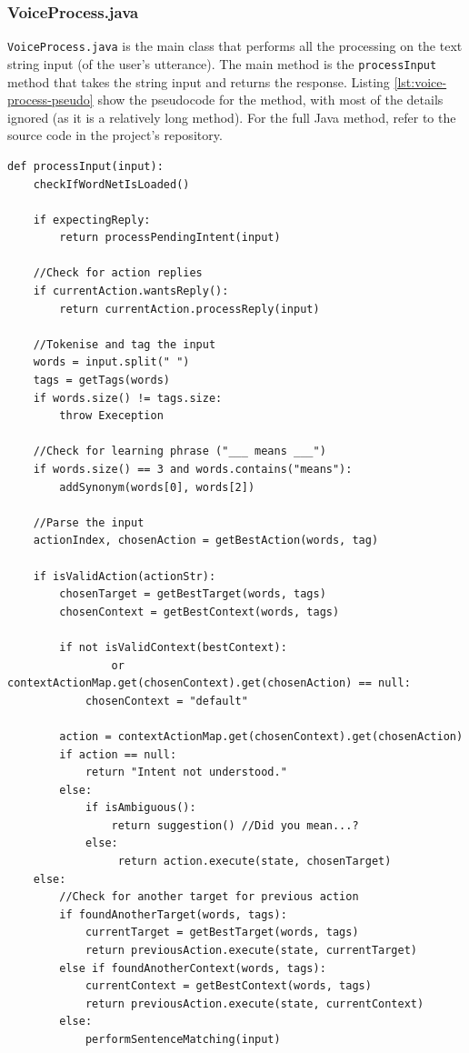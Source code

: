 \documentclass[12pt]{article}
\begin{document}
\subsubsection{VoiceProcess.java}

\texttt{VoiceProcess.java} is the main class that performs all the processing on the text string input (of the user's utterance). The main method is the \texttt{processInput} method that takes the string input and returns the response. Listing \ref{lst:voice-process-pseudo} show the pseudocode for the method, with most of the details ignored (as it is a relatively long method). For the full Java method, refer to the source code in the project's repository.

\begin{lstlisting}[caption=VoiceProcess.processInput() pseudocode, label={lst:voice-process-pseudo}]
def processInput(input):
    checkIfWordNetIsLoaded()
    
    if expectingReply:
        return processPendingIntent(input)
    
    //Check for action replies
    if currentAction.wantsReply():
        return currentAction.processReply(input)
    
    //Tokenise and tag the input
    words = input.split(" ")
    tags = getTags(words)
    if words.size() != tags.size:
        throw Exeception
    
    //Check for learning phrase ("___ means ___")
    if words.size() == 3 and words.contains("means"):
        addSynonym(words[0], words[2])
    
    //Parse the input
    actionIndex, chosenAction = getBestAction(words, tag)
    
    if isValidAction(actionStr):
        chosenTarget = getBestTarget(words, tags)
        chosenContext = getBestContext(words, tags)
        
        if not isValidContext(bestContext):
                or contextActionMap.get(chosenContext).get(chosenAction) == null:
            chosenContext = "default"
            
        action = contextActionMap.get(chosenContext).get(chosenAction)
        if action == null:
            return "Intent not understood."
        else:
            if isAmbiguous():
                return suggestion()	//Did you mean...?
            else:
                 return action.execute(state, chosenTarget)
    else:
    	//Check for another target for previous action
        if foundAnotherTarget(words, tags):
            currentTarget = getBestTarget(words, tags)
            return previousAction.execute(state, currentTarget)
        else if foundAnotherContext(words, tags):
            currentContext = getBestContext(words, tags)
            return previousAction.execute(state, currentContext)
        else:
            performSentenceMatching(input)
\end{lstlisting}
\end{document}
